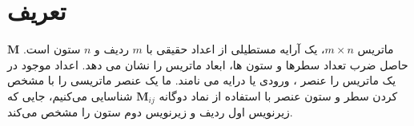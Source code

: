 \setcounter{figure}{0}
\renewcommand{\thefigure}{\arabic{figure}.\arabic{chapter}}


\section{\textbf{تعریف}}
\label{sec:2.1}
{
    \Large
    \begin{spacing}{1.5}
        $\textbf{M}$ ماتریس $m\times n$، یک آرایه مستطیلی از اعداد حقیقی با $m$ ردیف و $n$ ستون است.
        حاصل ضرب تعداد سطرها و ستون ها، ابعاد ماتریس را نشان می دهد.
        اعداد موجود در یک ماتریس را عنصر ، ورودی یا درایه می نامند.
        ما یک عنصر ماتریسی را با مشخص کردن سطر و ستون عنصر با استفاده از نماد دوگانه $\textbf{M}_{ij}$ شناسایی می‌کنیم،
        جایی که زیرنویس اول ردیف و زیرنویس دوم ستون را مشخص می‌کند.


\end{spacing}}
